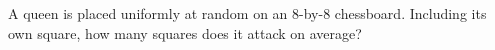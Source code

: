 A queen is placed uniformly at random on an 8-by-8 chessboard. Including its own square, how many squares does it attack on average?
